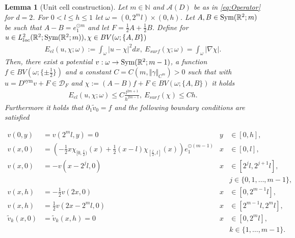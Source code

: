 \documentclass[a4paper, 10pt, twoside, notitlepage]{amsart}
\theoremstyle{plain}
\newtheorem{lem}[prop]{Lemma}
\newcommand{\R}{\mathbb{R}}
\newcommand{\N}{\mathbb{N}}
\newcommand{\p}{\partial}
\newcommand{\A}{\mathcal{A}}
\newcommand{\Ds}{D^{\text{sym}}}
\begin{document}
		
		\begin{lem}[Unit cell construction] 
                  \label{lem:UnitCell}
                  Let $m \in \N$ and $\A(D)$ be as in \cref{eq:Operator} for $d = 2$.  For $0 < l \le h \leq 1$ let $\omega = (0,2^ml) \times (0,h)$. Let
			$A,B \in \textup{Sym}(\R^2;m)$ be such that $A-B = e_1^{\odot m}$ and let $F = \frac{1}{2} A + \frac{1}{2} B$.  Define for
			$u \in L^2_{loc}(\R^2;\textup{Sym}(\R^2;m)), \chi \in BV(\omega;\{A,B\})$
			\begin{align*}
				E_{el}(u,\chi;\omega) := \int_{\omega} |u-\chi|^2 dx, \ E_{surf}(\chi;\omega) = \int_{\omega} |\nabla \chi|.
			\end{align*}
			Then, there exist a potential $v: \omega \to \textup{Sym}(\R^2;m-1)$, a function $f \in BV(\omega;\{\pm \frac{1}{2}\})$
			and a constant $C = C(m, \Vert \gamma \Vert_{C^m}) > 0$ such that with $u = \Ds v + F\in \mathcal{D}_F$ and $\chi := (A-B)f + F \in BV(\omega;\{A,B\})$ it holds
			\begin{align*}
				E_{el}(u,\chi;\omega) \leq C \frac{l^{2m+1}}{h^{2m-1}}, \ E_{surf}(\chi) \leq C h.
			\end{align*}
			Furthermore it holds that $\p_1 \tilde{v}_0 = f$ and the following boundary conditions are satisfied 
                        
			\begin{align*}
                          v(0,y) &= v(2^ml,y) = 0 & y &\in [0,h], \\
                          v(x,0) & = (-\frac{1}{2}x \chi_{[0,\frac{l}{2})}(x) + \frac{1}{2}(x-l) \chi_{[\frac{l}{2},l]}(x)) e_1^{\odot(m-1)} & x & \in [0,l], \\
                          v(x,0) & = - v(x-2^jl,0) & x & \in [2^jl,2^{j+1}l], \\
                          & & & j \in \{ 0,1,\dots,m-1\}, \\
                          v(x,h) & = - \frac{1}{2} v(2x,0) & x & \in [0,2^{m-1}l],\\
                          v(x,h) & = \frac{1}{2} v(2x-2^{m}l,0) & x & \in [2^{m-1}l,2^ml], \\
                          \tilde{v}_k(x,0) & = \tilde{v}_k(x,h) =  0 & x & \in [0,2^ml], \\
                          && &k \in \{1,\dots,m-1\}.
                        \end{align*}
                        
		\end{lem}
		
\end{document}
